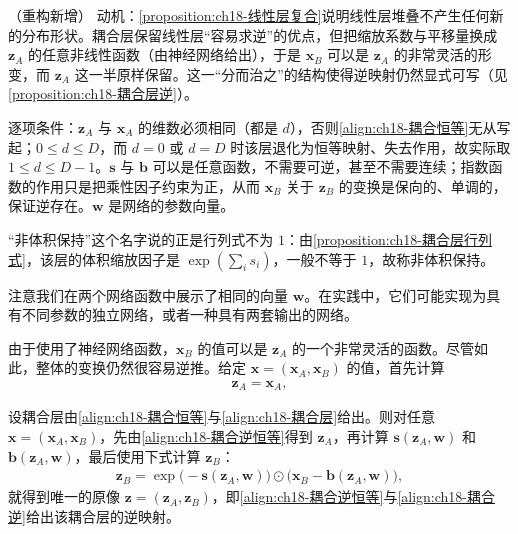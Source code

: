 \documentclass[../../main.tex]{subfiles}
\begin{document}
\begin{remark}（重构新增）
动机：\cref{proposition:ch18-线性层复合}说明线性层堆叠不产生任何新的分布形状。耦合层保留线性层“容易求逆”的优点，但把缩放系数与平移量换成 $\bm{z}_A$ 的任意非线性函数（由神经网络给出），于是 $\bm{x}_B$ 可以是 $\bm{z}_A$ 的非常灵活的形变，而 $\bm{z}_A$ 这一半原样保留。这一“分而治之”的结构使得逆映射仍然显式可写（见\cref{proposition:ch18-耦合层逆}）。

逐项条件：$\bm{z}_A$ 与 $\bm{x}_A$ 的维数必须相同（都是 $d$），否则\eqref{align:ch18-耦合恒等}无从写起；$0\leqslant d\leqslant D$，而 $d=0$ 或 $d=D$ 时该层退化为恒等映射、失去作用，故实际取 $1\leqslant d\leqslant D-1$。$\bm{s}$ 与 $\bm{b}$ 可以是任意函数，不需要可逆，甚至不需要连续；指数函数的作用只是把乘性因子约束为正，从而 $\bm{x}_B$ 关于 $\bm{z}_B$ 的变换是保向的、单调的，保证逆存在。$\bm{w}$ 是网络的参数向量。

“非体积保持”这个名字说的正是行列式不为 $1$：由\cref{proposition:ch18-耦合层行列式}，该层的体积缩放因子是 $\exp\left(\sum_i s_i\right)$，一般不等于 $1$，故称非体积保持。
\end{remark}

注意我们在两个网络函数中展示了相同的向量 $\bm{w}$。在实践中，它们可能实现为具有不同参数的独立网络，或者一种具有两套输出的网络。

由于使用了神经网络函数，$\bm{x}_B$ 的值可以是 $\bm{z}_A$ 的一个非常灵活的函数。尽管如此，整体的变换仍然很容易逆推。给定 $\bm{x}=(\bm{x}_A,\bm{x}_B)$ 的值，首先计算
\begin{align}
  \bm{z}_A=\bm{x}_A,\label{align:ch18-耦合逆恒等}
\end{align}

\begin{proposition}[耦合层的逆]\label{proposition:ch18-耦合层逆}
设耦合层由\eqref{align:ch18-耦合恒等}与\eqref{align:ch18-耦合层}给出。则对任意 $\bm{x}=(\bm{x}_A,\bm{x}_B)$，先由\eqref{align:ch18-耦合逆恒等}得到 $\bm{z}_A$，再计算 $\bm{s}(\bm{z}_A,\bm{w})$ 和 $\bm{b}(\bm{z}_A,\bm{w})$，最后使用下式计算 $\bm{z}_B$：
\begin{align}
  \bm{z}_B=\exp\big(-\bm{s}(\bm{z}_A,\bm{w})\big)\odot\big(\bm{x}_B-\bm{b}(\bm{z}_A,\bm{w})\big),\label{align:ch18-耦合逆}
\end{align}
就得到唯一的原像 $\bm{z}=(\bm{z}_A,\bm{z}_B)$，即\eqref{align:ch18-耦合逆恒等}与\eqref{align:ch18-耦合逆}给出该耦合层的逆映射。
\end{proposition}
\end{document}

